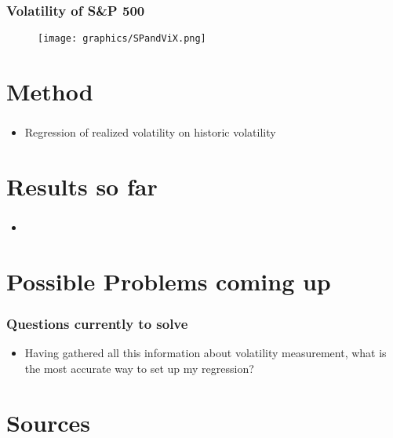 \documentclass[aspectratio=169]{beamer}
\begin{document}
\begin{frame}
\frametitle{Volatility of S\&P 500}
	\begin{figure}
	\centering
	\texttt{[image: graphics/SPandViX.png]}
	\end{figure}
\end{frame}


\section{Method}

\begin{frame}
\frametitle{}
	\begin{itemize}
	\item Regression of realized volatility on historic volatility
	\end{itemize}
\end{frame}


\section{Results so far}

\begin{frame}
\frametitle{}
	\begin{itemize}
	\item
	\end{itemize}
\end{frame}


\section{Possible Problems coming up}

\begin{frame}
\frametitle{Questions currently to solve}
	\begin{itemize}
	\item Having gathered all this information about volatility measurement, what is the most accurate way to set up my regression?
	
	\end{itemize}
\end{frame}

\section*{Sources}
\begin{frame}
\printbibliography
\end{frame}
\end{document}

